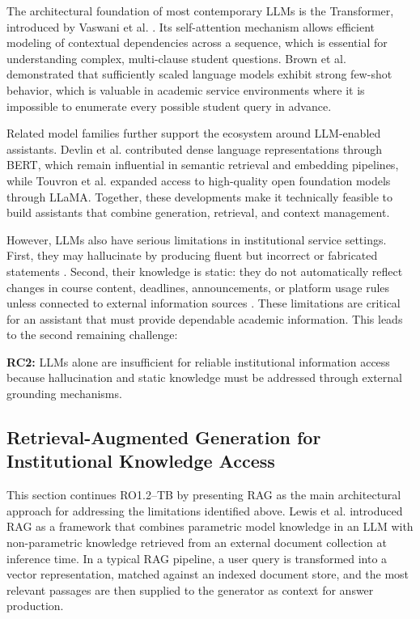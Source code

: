 \documentclass[a4paper,9pt,twocolumn]{extarticle}
\begin{document}
The architectural foundation of most contemporary LLMs is the
Transformer, introduced by Vaswani et al. \cite{vaswani2017attention}.
Its self-attention mechanism allows efficient modeling of contextual
dependencies across a sequence, which is essential for understanding
complex, multi-clause student questions. Brown et al.
\cite{brown2020language} demonstrated that sufficiently scaled language
models exhibit strong few-shot behavior, which is valuable in academic
service environments where it is impossible to enumerate every possible
student query in advance.

Related model families further support the ecosystem around LLM-enabled
assistants. Devlin et al. \cite{devlin2019bert} contributed dense
language representations through BERT, which remain influential in
semantic retrieval and embedding pipelines, while Touvron et al.
\cite{touvron2023llama} expanded access to high-quality open foundation
models through LLaMA. Together, these developments make it technically
feasible to build assistants that combine generation, retrieval, and
context management.

However, LLMs also have serious limitations in institutional service
settings. First, they may hallucinate by producing fluent but incorrect
or fabricated statements \cite{zhao2023survey,gao2023retrieval}. Second,
their knowledge is static: they do not automatically reflect changes in
course content, deadlines, announcements, or platform usage rules unless
connected to external information sources \cite{lewis2020retrieval,
soliman2025rag}. These limitations are critical for an assistant that
must provide dependable academic information. This leads to the second
remaining challenge:

\textbf{RC2:} LLMs alone are insufficient for reliable institutional
information access because hallucination and static knowledge must be
addressed through external grounding mechanisms.

\subsection{Retrieval-Augmented Generation for Institutional Knowledge Access}
\label{sec:soa:rag}

This section continues RO1.2--TB by presenting RAG as the main
architectural approach for addressing the limitations identified above.
Lewis et al. \cite{lewis2020retrieval} introduced RAG as a framework
that combines parametric model knowledge in an LLM with non-parametric
knowledge retrieved from an external document collection at inference
time. In a typical RAG pipeline, a user query is transformed into a
vector representation, matched against an indexed document store, and
the most relevant passages are then supplied to the generator as context
for answer production.
\end{document}
